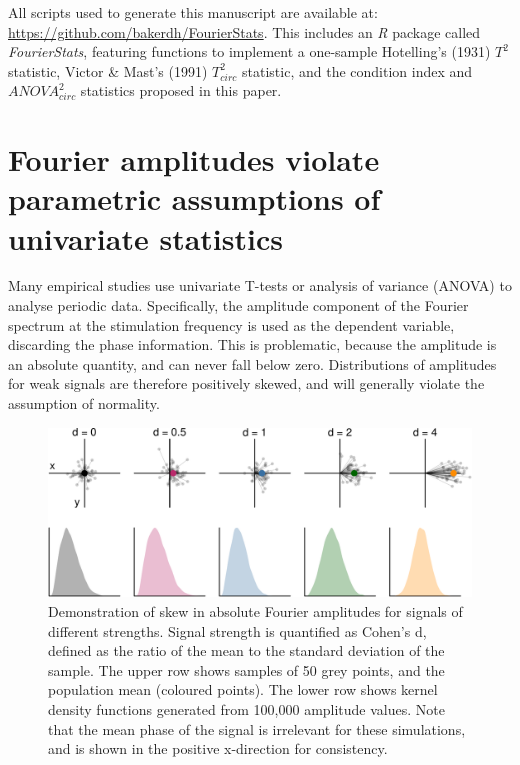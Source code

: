 \documentclass[]{article}
\begin{document}
All scripts used to generate this manuscript are available at: \url{https://github.com/bakerdh/FourierStats}. This includes an \emph{R} package called \emph{FourierStats}, featuring functions to implement a one-sample Hotelling's (1931) \(T^2\) statistic, Victor \& Mast's (1991) \(T^2_{circ}\) statistic, and the condition index and \(ANOVA^2_{circ}\) statistics proposed in this paper.

\hypertarget{fourier-amplitudes-violate-parametric-assumptions-of-univariate-statistics}{%
\section{Fourier amplitudes violate parametric assumptions of univariate statistics}\label{fourier-amplitudes-violate-parametric-assumptions-of-univariate-statistics}}

Many empirical studies use univariate T-tests or analysis of variance (ANOVA) to analyse periodic data. Specifically, the amplitude component of the Fourier spectrum at the stimulation frequency is used as the dependent variable, discarding the phase information. This is problematic, because the amplitude is an absolute quantity, and can never fall below zero. Distributions of amplitudes for weak signals are therefore positively skewed, and will generally violate the assumption of normality.

\begin{figure}

{\centering \includegraphics{manuscript_files/figure-latex/amphists-1} 

}

\caption{Demonstration of skew in absolute Fourier amplitudes for signals of different strengths. Signal strength is quantified as Cohen's d, defined as the ratio of the mean to the standard deviation of the sample. The upper row shows samples of 50 grey points, and the population mean (coloured points). The lower row shows kernel density functions generated from 100,000 amplitude values. Note that the mean phase of the signal is irrelevant for these simulations, and is shown in the positive x-direction for consistency.}\label{fig:amphists}
\end{figure}
\end{document}
